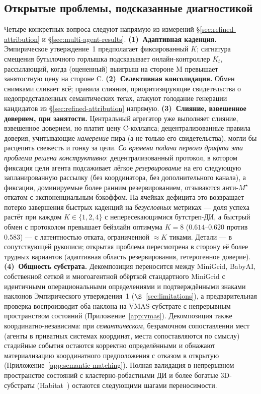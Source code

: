 \documentclass{article}
\begin{document}
\subsection{Открытые проблемы, подсказанные диагностикой}
\label{app:open-problems}

Четыре конкретных вопроса следуют напрямую из измерений \S\ref{sec:refined-attribution} и \S\ref{sec:multi-agent-results}.
\textbf{(1)~Адаптивная каденция.} Эмпирическое утверждение~1 предполагает фиксированный $K$; сигнатура смещения бутылочного горлышка подсказывает онлайн-контроллер $K_t$, рассылающий, когда (оцененный) выигрыш на стороне M превышает занятостную цену на стороне C.
\textbf{(2)~Селективная консолидация.} Обмен снимками сливает всё; правила слияния, приоритизирующие свидетельства о недопредставленных семантических тегах, атакуют голодание генерации кандидатов из \S\ref{sec:refined-attribution} напрямую.
\textbf{(3)~Слияние, взвешенное доверием, при занятости.} Центральный агрегатор уже выполняет слияние, взвешенное доверием, но платит цену C-коллапса; децентрализованные правила доверия, учитывающие \emph{намерение} пира (а не только его свидетельства), могли бы расцепить свежесть и гонку за цели. \emph{Со времени подачи первого драфта эта проблема решена конструктивно}: децентрализованный протокол, в котором фиксация цели агента подсаживает лёгкое \emph{резервирование} на его следующую запланированную рассылку (без координатора, без дополнительного канала), а фиксации, доминируемые более ранним резервированием, отзываются анти-$M^\star$ откатом с экспоненциальным бэкоффом. На ячейках дефицита это возвращает потерю завершения быстрых каденций на \emph{безусловных} метриках --- доля успеха растёт при каждом $K\in\{1,2,4\}$ с непересекающимися бутстреп-ДИ, а быстрый обмен с протоколом превышает бейзлайн оптимума $K{=}8$ ($0.614$--$0.620$ против $0.583$) --- с латентностью отката, ограниченной ${\approx}K$ тиками. Детали --- в сопутствующей рукописи; открытая проблема пересмотрена в сторону её более трудных вариантов (адаптивная область резервирования, гетерогенное доверие).
\textbf{(4)~Общность субстрата.} Декомпозиция переносится между MiniGrid, BabyAI, собственной сеткой и многоагентной обёрткой стандартного MiniGrid с идентичными операциональными определениями и подтверждёнными знаками наклонов Эмпирического утверждения~1 ($\S$~\ref{sec:limitations}), а предварительная проверка воспроизводит оба наклона на VMAS-субстрате с непрерывным пространством состояний (Приложение~\ref{app:vmas}). Декомпозиция также координатно-независима: при \emph{семантическом}, безрамочном сопоставлении мест (агенты в приватных системах координат, места сопоставляются по смыслу) стадийные события остаются корректно определёнными и обнажают материализацию координатного предположения с отказом в открытую (Приложение~\ref{app:semantic-matching}). Полная валидация в непрерывном пространстве состояний с кластерно-робастными ДИ и более богатые 3D-субстраты (Habitat~\citep{savva2019habitat}) остаются следующими шагами переносимости.
\end{document}
